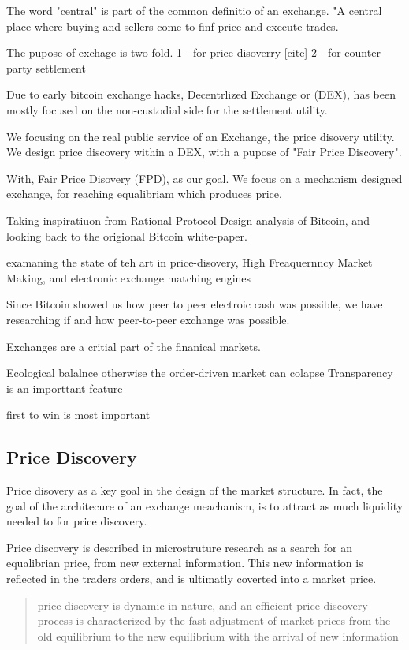 \documentclass[12pt]{article}
\begin{document}
 
The word "central" is part of the common definitio of an exchange. "A central place where buying and sellers come to finf price and execute trades. 

The pupose of exchage is two fold. 1 - for price disoverry [cite]  2 - for counter party settlement 

Due to early bitcoin exchange hacks, Decentrlized Exchange or (DEX), has been mostly focused on the non-custodial side for the settlement utility. 
 
We focusing on the real public service of an Exchange, the price disovery utility. We design price discovery within a DEX, with a pupose of "Fair Price Discovery". 

With, Fair Price Disovery (FPD), as our goal. We focus on a mechanism designed exchange, for reaching equalibriam which produces price. 

Taking inspiratiuon from Rational Protocol Design analysis of Bitcoin, and looking back to the origional Bitcoin white-paper. 


examaning the state of teh art in price-disovery, High Freaquernncy Market Making, and electronic exchange matching engines  

Since Bitcoin showed us how peer to peer electroic cash was possible, we have researching if and how peer-to-peer exchange was possible. 

Exchanges are a critial part of the finanical markets.  

Ecological balalnce otherwise the order-driven market can colapse 
Transparency is an importtant feature 

first to win is most important 


\subsection*{Price Discovery}
Price disovery as a key goal in the design of the market structure. In fact, the goal of the architecure of an exchange meachanism, is to attract as much liquidity needed to for price discovery.  \cite{francioni_schwartz_2017}

Price discovery is described in microstruture research as a search for an equalibrian price, from new external information. This new information is reflected in the traders orders, and is ultimatly coverted into a market price. \citep{RePEc:nbr:nberwo:6257}

\begin{quote}
    price discovery is dynamic in nature, and an efficient price discovery process is characterized by the fast adjustment of market prices from the old equilibrium to the new equilibrium with the arrival of new information \cite{RePEc:udb:wpaper:uwec-2005-01-r}    
\end{quote}
\end{document}
